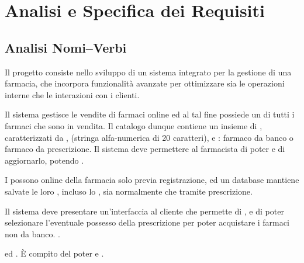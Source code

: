 \chapter{Analisi e Specifica dei Requisiti}

\section{Analisi Nomi--Verbi}
Il progetto consiste nello sviluppo di un sistema integrato per la gestione di una farmacia, che incorpora funzionalità avanzate per ottimizzare sia le operazioni interne che le interazioni con i clienti.

\noindent Il sistema gestisce le vendite di farmaci online ed al tal fine possiede un  di tutti i farmaci che sono in vendita. Il catalogo dunque contiene un insieme di , caratterizzati da ,  (stringa alfa-numerica di 20 caratteri),  e : farmaco da banco o farmaco da prescrizione. Il sistema deve permettere al farmacista di poter  e di aggiornarlo, potendo .

\noindent I  possono  online della farmacia solo previa registrazione, ed un database mantiene salvate le loro , incluso lo , sia normalmente che tramite prescrizione.

\noindent Il sistema deve presentare un'interfaccia al cliente che permette di   , e di poter selezionare l'eventuale possesso della prescrizione per poter acquistare i farmaci non da banco. .

\noindent {} ed   . \`E compito del  poter  e .

